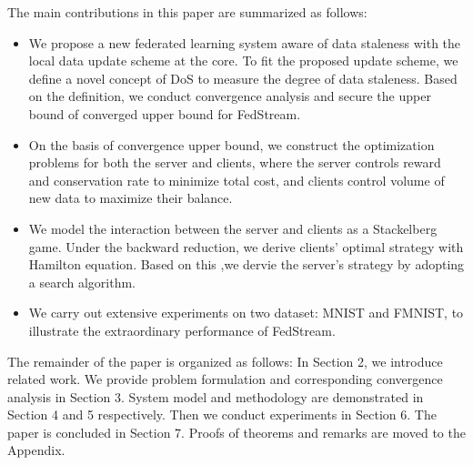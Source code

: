 \documentclass{article}
\theoremstyle{plain}
\theoremstyle{definition}
\theoremstyle{remark}
\begin{document}
The main contributions in this paper are summarized as follows:
\begin{itemize}
  \item We propose a new federated learning system aware of data staleness with the local data update scheme at the core. To fit the proposed update scheme, we define a novel concept of DoS to measure the degree of data staleness. Based on the definition, we conduct convergence analysis and secure the upper bound of converged upper bound for FedStream.
  \item On the basis of convergence upper bound, we construct the optimization problems for both the server and clients, where the server controls reward and conservation rate to minimize total cost, and clients control volume of new data to maximize their balance.
  \item We model the interaction between the server and clients as a Stackelberg game. Under the backward reduction, we derive clients' optimal strategy with Hamilton equation. Based on this ,we dervie the server's strategy by adopting a search algorithm.
  \item We carry out extensive experiments on two dataset: MNIST and FMNIST, to illustrate the extraordinary performance of FedStream.
\end{itemize}
The remainder of the paper is organized as follows: In Section 2, we introduce related work. We provide problem formulation and corresponding convergence analysis in Section 3. System model and methodology are demonstrated in Section 4 and 5 respectively. Then we conduct experiments in Section 6. The paper is concluded in Section 7.
Proofs of theorems and remarks are moved to the Appendix.

\end{document}
